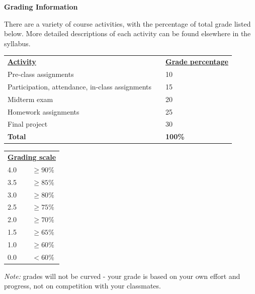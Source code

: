 \documentclass[oneside,letterpaper,11pt]{exam}
\begin{document}
\newpage

\begin{center}
	\vspace{5pt}
	\textbf{Grading Information}
	\vspace{5pt}
\end{center}

{\noindent There are a variety of course activities, with the percentage of total grade listed below. More detailed descriptions of each activity can be found elsewhere in the syllabus.}\\
\begin{table}[h!]
\renewcommand{\arraystretch}{1.25}
\begin{tabular}{lll}
  \underline{\textbf{Activity}} & \qquad & \underline{\textbf{Grade percentage}}  \\  
Pre-class assignments & \qquad & 10  \\ 
Participation, attendance, in-class assignments & \qquad &15 \\ 
Midterm exam & \qquad &20 \\ 
Homework assignments & \qquad & 25 \\
Final project & \qquad & 30 \\[5pt]
\textbf{Total} & \qquad & \textbf{100\%}
\end{tabular}
\end{table}
\begin{table}[h!]
\renewcommand{\arraystretch}{1.25}
\begin{tabular}{lll}
\multicolumn{3}{c}{\underline{\textbf{Grading scale}}}  \\  
4.0 & \qquad & $\geq 90\%$  \\ 
3.5 & \qquad & $\geq 85\%$  \\ 
3.0 & \qquad & $\geq 80\%$  \\ 
2.5 & \qquad & $\geq 75\%$  \\ 
2.0 & \qquad & $\geq 70\%$  \\ 
1.5 & \qquad & $\geq 65\%$  \\ 
1.0 & \qquad & $\geq 60\%$  \\ 
0.0 & \qquad & $< 60\%$  
\end{tabular}
\end{table}

{\noindent \emph{Note:} grades will not be curved - your grade is based on your own effort and progress, not on competition with your classmates.}
\end{document}
